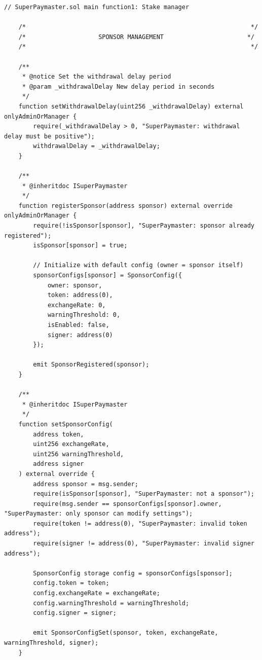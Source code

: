\documentclass[preprint,12pt]{elsarticle}
\begin{document}
\begin{verbatim}
// SuperPaymaster.sol main function1: Stake manager

    /*                                                              */
    /*                    SPONSOR MANAGEMENT                       */
    /*                                                              */

    /**
     * @notice Set the withdrawal delay period
     * @param _withdrawalDelay New delay period in seconds
     */
    function setWithdrawalDelay(uint256 _withdrawalDelay) external onlyAdminOrManager {
        require(_withdrawalDelay > 0, "SuperPaymaster: withdrawal delay must be positive");
        withdrawalDelay = _withdrawalDelay;
    }

    /**
     * @inheritdoc ISuperPaymaster
     */
    function registerSponsor(address sponsor) external override onlyAdminOrManager {
        require(!isSponsor[sponsor], "SuperPaymaster: sponsor already registered");
        isSponsor[sponsor] = true;
        
        // Initialize with default config (owner = sponsor itself)
        sponsorConfigs[sponsor] = SponsorConfig({
            owner: sponsor,
            token: address(0),
            exchangeRate: 0,
            warningThreshold: 0,
            isEnabled: false,
            signer: address(0)
        });
        
        emit SponsorRegistered(sponsor);
    }

    /**
     * @inheritdoc ISuperPaymaster
     */
    function setSponsorConfig(
        address token,
        uint256 exchangeRate,
        uint256 warningThreshold,
        address signer
    ) external override {
        address sponsor = msg.sender;
        require(isSponsor[sponsor], "SuperPaymaster: not a sponsor");
        require(msg.sender == sponsorConfigs[sponsor].owner, "SuperPaymaster: only sponsor can modify settings");
        require(token != address(0), "SuperPaymaster: invalid token address");
        require(signer != address(0), "SuperPaymaster: invalid signer address");
        
        SponsorConfig storage config = sponsorConfigs[sponsor];
        config.token = token;
        config.exchangeRate = exchangeRate;
        config.warningThreshold = warningThreshold;
        config.signer = signer;
        
        emit SponsorConfigSet(sponsor, token, exchangeRate, warningThreshold, signer);
    }
\end{verbatim}
\end{document}
